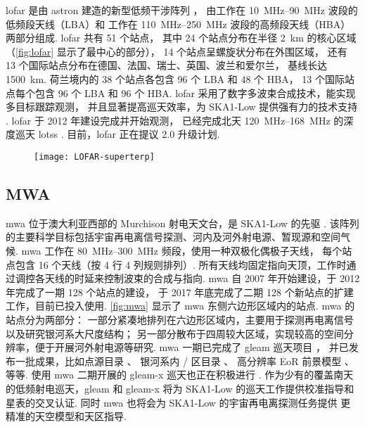 \acf{lofar} 是由 \ac{astron} 建造的新型低频干涉阵列 \cite{vanHaarlem2013}，
由工作在 \SIrange{10}{90}{\MHz} 波段的低频段天线（LBA）和
工作在 \SIrange{110}{250}{\MHz} 波段的高频段天线（HBA）两部分组成.
\acs{lofar} 共有 51 个站点，
其中 24 个站点分布在半径 \SI{2}{\km} 的核心区域
（\autoref{fig:lofar} 显示了最中心的部分），
14 个站点呈螺旋状分布在外围区域，
还有 13 个国际站点分布在德国、法国、瑞士、英国、波兰和爱尔兰，
基线长达 \SI{1500}{\km}.
荷兰境内的 38 个站点各包含 96 个 LBA 和 48 个 HBA，
13 个国际站点每个包含 96 个 LBA 和 96 个 HBA.
\acs{lofar} 采用了数字多波束合成技术，能实现多目标跟踪观测，
并且显著提高巡天效率，为 SKA1-Low 提供强有力的技术支持
\cite{deVos2009,vanHaarlem2013,pizzo2018}.
\acs{lofar} 于 2012 年建设完成并开始观测，
已经完成北天 \SIrange{120}{168}{\MHz} 的深度巡天
\ac{lotss} \cite{shimwell2017,shimwell2019}.
目前，\acs{lofar} 正在提议 2.0 升级计划.

\begin{figure}[htp]
  \centering
  \texttt{[image: LOFAR-superterp]}
  \label{fig:lofar}
\end{figure}

\subsection{MWA}

\acf{mwa} 位于澳大利亚西部的 Murchison 射电天文台，是 SKA1-Low 的先驱
\cite{lonsdale2009,bowman2013,tingay2013,wayth2018}.
该阵列的主要科学目标包括宇宙再电离信号探测、河内及河外射电源、暂现源和空间气候.
\acs{mwa} 工作在 \SIrange{80}{300}{\MHz} 频段，使用一种双极化偶极子天线，
每个站点包含 16 个天线（按 4 行 4 列规则排列）.
所有天线均固定指向天顶，工作时通过调控各天线的时延来控制波束的合成与指向.
\acs{mwa} 自 2007 年开始建设，于 2012 年完成了一期 128 个站点的建设，
于 2017 年底完成了二期 128 个新站点的扩建工作\cite{wayth2018}，目前已投入使用.
\autoref{fig:mwa} 显示了 \acs{mwa} 东侧六边形区域内的站点.
\acs{mwa} 的站点分为两部分：
一部分紧凑地排列在六边形区域内，主要用于探测再电离信号以及研究银河系大尺度结构；
另一部分散布于四周较大区域，实现较高的空间分辨率，便于开展河外射电源等研究.
\acs{mwa} 一期已完成了 \ac{gleam} 巡天项目 \cite{wayth2015}，
并已发布一批成果，比如点源目录 \cite{hurleyWalker2017}、
银河系内 \Hii/ 区目录 \cite{su2018}、
高分辨率 EoR 前景模型 \cite{procopio2017}、等等.
使用 \acs{mwa} 二期开展的 \ac{gleam-x} 巡天也正在积极进行 \cite{hurleyWalker2017prop}.
作为少有的覆盖南天的低频射电巡天，\acs{gleam} 和 \acs{gleam-x}
将为 SKA1-Low 的巡天工作提供校准指导和星表的交叉认证.
同时 \acs{mwa} 也将会为 SKA1-Low 的宇宙再电离探测任务提供
更精准的天空模型和天区指导.

